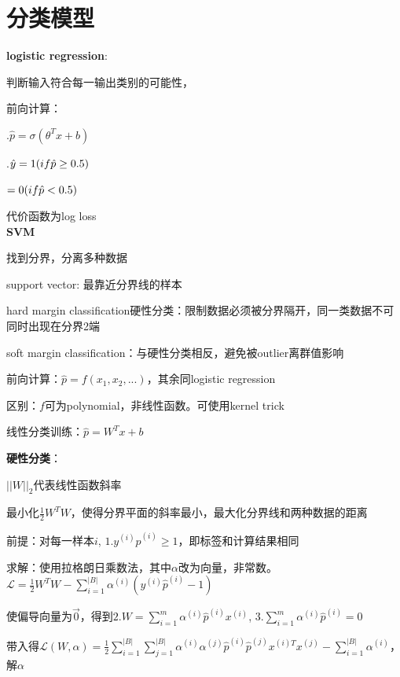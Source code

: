\documentclass[UTF8]{ctexart}
\begin{document}
\section{分类模型}
\noindent \textbf{logistic regression}:

  判断输入符合每一输出类别的可能性，

  前向计算：
  
  .$\hat{p} = \sigma(\theta^Tx + b)$

  .$\hat{y} = 1\space (if \hat{p} \geq 0.5)$

  \quad \quad \quad $= 0\space (if \hat{p} < 0.5)$

  代价函数为log loss\\
\textbf{SVM}

  找到分界，分离多种数据

  support vector: 最靠近分界线的样本

  hard margin classification硬性分类：限制数据必须被分界隔开，同一类数据不可同时出现在分界2端

  soft margin classification：与硬性分类相反，避免被outlier离群值影响

  前向计算：$\hat{p} = f(x_1, x_2,...)$，其余同logistic regression

  \quad 区别：$f$可为polynomial，非线性函数。可使用kernel trick

  线性分类训练：$\hat{p} = W^Tx + b$

  \quad \textbf{硬性分类}：

  \quad \quad $||W||_2$代表线性函数斜率

  \quad \quad 最小化$\frac{1}{2}W^TW$，使得分界平面的斜率最小，最大化分界线和两种数据的距离

  \quad \quad 前提：对每一样本$i$, $1.y^{(i)}\hat{p}^{(i)} \geq 1$，即标签和计算结果相同

  \quad \quad 求解：使用拉格朗日乘数法，其中$\alpha$改为向量，非常数。$\mathcal{L} = \frac{1}{2}W^TW - \sum_{i=1}^{|B|}\alpha^{(i)}(y^{(i)}\hat{p}^{(i)} - 1)$

  \quad \quad \quad 使偏导向量为$\vec{0} $，得到$2.W = \sum_{i=1}^{m}\alpha^{(i)}\hat{p}^{(i)}x^{(i)}$, $3.\sum_{i=1}^{m}\alpha^{(i)}\hat{p}^{(i)}=0$

  \quad \quad \quad 带入得$\mathcal{L} (W, \alpha) = \frac{1}{2}\sum_{i=1}^{|B|}\sum_{j=1}^{|B|}\alpha^{(i)}\alpha^{(j)}\hat{p}^{(i)}\hat{p}^{(j)}x^{(i)T}x^{(j)} - \sum_{i=1}^{|B|}\alpha^{(i)}$，解$\alpha$
\end{document}
